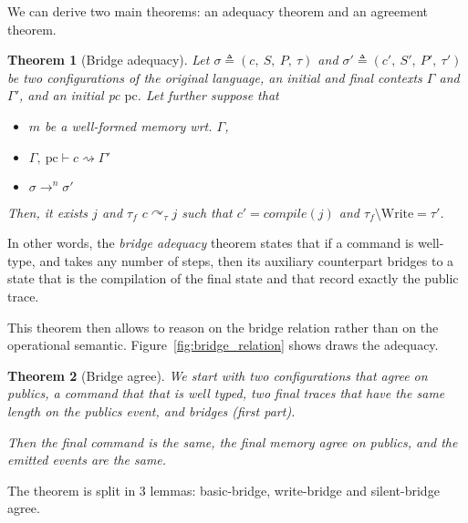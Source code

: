 \documentclass[10pt]{article}
\newcommand{\pc}{\mathrm{pc}}
\newcommand{\ctx}{\Gamma}
\newcommand{\conf}{\sigma}
\newcommand{\typing}[4]{ #1,~#2 \vdash #3 \rightsquigarrow #4}
\newcommand{\execn}[3] { #1 \rightarrow^{#2} #3 }
\newcommand{\bridge}[3] { #1 \curvearrowright_{#2} #3 }
\newtheorem{theorem}{Theorem}
\begin{document}
We can derive two main theorems: an adequacy theorem and an agreement theorem.
\begin{theorem}[Bridge adequacy]
  Let $\conf \triangleq (c,~S,~P,~\tau)$ and $\conf' \triangleq (c',~S',~P',~\tau')$ be two
  configurations of the original language, an initial and final contexts $\ctx$ and $\ctx'$, and an
  initial pc $\pc$.
  Let further suppose that

 \begin{itemize}
   \item $m$ be a well-formed memory wrt. $\ctx$,
   \item \(\typing{\ctx}{\pc}{c}{\ctx'} \)
   \item \( \execn{\conf}{n}{\conf'} \)
 \end{itemize}

  Then, it exists $j$ and $\tau_{f}$ \( \bridge{c}{\tau}{j} \) such that $c' = compile(j)$ and $\tau_{f} \setminus \mathrm{Write} = \tau'$.
\end{theorem}

In other words, the \emph{bridge adequacy} theorem states that if a command is well-type, and takes
any number of steps, then its auxiliary counterpart bridges to a state that is the compilation of
the final state and that record exactly the public trace.

This theorem then allows to reason on the bridge relation rather than on the operational semantic.
Figure~\ref{fig:bridge_relation} shows draws the adequacy.




\begin{theorem}[Bridge agree]
  We start with two configurations that agree on publics, a command that that is well typed, two
  final traces that have the same length on the publics event, and bridges (first part).

  Then the final command is the same, the final memory agree on publics, and the emitted events are
  the same.
\end{theorem}


The theorem is split in 3 lemmas: basic-bridge, write-bridge and silent-bridge agree.
\end{document}
